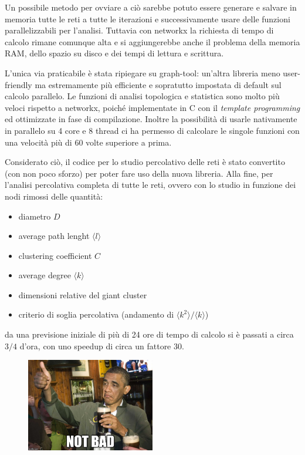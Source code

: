 Un possibile metodo per ovviare a ciò sarebbe potuto essere generare e salvare in memoria tutte le reti a tutte le iterazioni e successivamente usare delle funzioni parallelizzabili per l'analisi. Tuttavia con networkx la richiesta di tempo di calcolo rimane comunque alta e si aggiungerebbe anche il problema della memoria RAM, dello spazio su disco e dei tempi di lettura e scrittura.

L'unica via praticabile è stata ripiegare su graph-tool: un'altra libreria meno user-friendly ma estremamente più efficiente e sopratutto impostata di default sul calcolo parallelo. Le funzioni di analisi topologica e statistica sono molto più veloci rispetto a networkx, poiché implementate in C con il \emph{template programming} ed ottimizzate in fase di compilazione. Inoltre la possibilità di usarle nativamente in parallelo su 4 core e 8 thread ci ha permesso di calcolare le singole funzioni con una velocità più di 60 volte superiore a prima.

Considerato ciò, il codice per lo studio percolativo delle reti è stato convertito (con non poco sforzo) per poter fare uso della nuova libreria. Alla fine, per l'analisi percolativa completa di tutte le reti, ovvero con lo studio in funzione dei nodi rimossi delle quantità:

\begin{itemize}
 \item   diametro $D$
 \item   average path lenght $\langle l \rangle$
 \item   clustering coefficient $C$
 \item   average degree $\langle k \rangle$
 \item   dimensioni relative del giant cluster
 \item   criterio di soglia percolativa (andamento di $\langle k^2 \rangle / \langle k \rangle$)
\end{itemize}

da una previsione iniziale di più di 24 ore di tempo di calcolo si è passati a circa $3/4$ d'ora, con uno speedup di circa un fattore 30.

\begin{figure}[h!]
	\centering
	\includegraphics[width=0.5\textwidth]{./Immagini/Attack/meme_Obama.jpg}
\end{figure}

